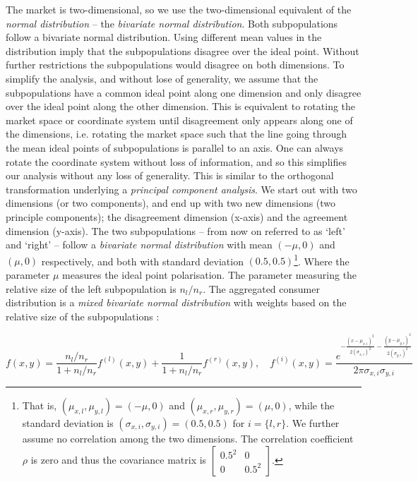 \documentclass[preprint, 12pt]{elsarticle}
\begin{document}
The market is two-dimensional, so we use the two-dimensional equivalent of the \emph{normal distribution} -- the \emph{bivariate normal distribution}. Both subpopulations follow a bivariate normal distribution. Using different mean values in the distribution imply that the subpopulations disagree over the ideal point. Without further restrictions the subpopulations would disagree on both dimensions. To simplify the analysis, and without lose of generality, we assume that the subpopulations have a common ideal point along one dimension and only disagree over the ideal point along the other dimension. This is equivalent to rotating the market space or coordinate system until disagreement only appears along one of the dimensions, i.e. rotating the market space such that the line going through the mean ideal points of subpopulations is parallel to an axis. One can always rotate the coordinate system without loss of information, and so this simplifies our analysis without any loss of generality. This is similar to the orthogonal transformation underlying a \emph{principal component analysis}. We start out with two dimensions (or two components), and end up with two new dimensions (two principle components); the disagreement dimension (x-axis) and the agreement dimension (y-axis). The two subpopulations -- from now on referred to as `left' and `right' -- follow a \emph{bivariate normal distribution} with mean $(-\mu,0)$ and $(\mu,0)$ respectively, and both with standard deviation $(0.5, 0.5)$\footnote{That is, $(\mu_{x,l},\mu_{y,l}) = (-\mu,0)$ and $(\mu_{x,r},\mu_{y,r}) = (\mu,0)$, while the standard deviation is $(\sigma_{x,i},\sigma_{y,i}) = (0.5, 0.5)$ for $i = \{l,r\}$. We further assume no correlation among the two dimensions. The correlation coefficient $\rho$ is zero and thus the covariance matrix is $\left[ {\begin{array}{*{20}{c}} {{{0.5}^2}}&0\\ 0&{{{0.5}^2}} \end{array}} \right]$.}. Where the parameter $\mu$ measures the ideal point polarisation. The parameter measuring the relative size of the left subpopulation is $n_l/n_r$. The aggregated consumer distribution is a \emph{mixed bivariate normal distribution} with weights based on the relative size of the subpopulations \citep{Weisstein_2002b, Balakrishnan_Lai_2009}:

\begin{equation}
f(x,y) = \frac{n_l/n_r}{1+n_l/n_r} f^{(l)}(x,y) + \frac{1}{1+n_l/n_r} f^{(r)}(x,y), \quad f^{(i)}(x,y) = \frac{e^{-\frac{(x-\mu_{x,i})^2}{2(\sigma_{x,i})^2} - \frac{(y-\mu_{y,i})^2}{2(\sigma_{y,i})^2}}}{2\pi\sigma_{x,i}\sigma_{y,i}}
\end{equation}
\end{document}
